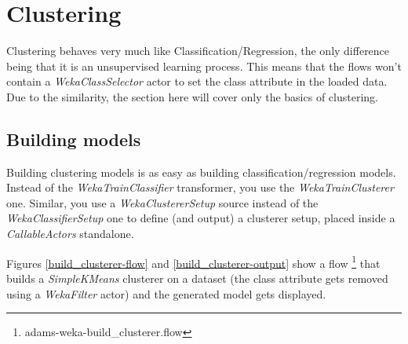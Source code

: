 %

\chapter{Clustering}
\label{clustering}
Clustering behaves very much like Classification/Regression, the only difference
being that it is an unsupervised learning process. This means that the flows
won't contain a \textit{WekaClassSelector} actor to set the class attribute in
the loaded data. Due to the similarity, the section here will cover only
the basics of clustering.

\section{Building models}
Building clustering models is as easy as building classification/regression
models. Instead of the \textit{WekaTrainClassifier} transformer, you use the
\textit{WekaTrainClusterer} one. Similar, you use a \textit{WekaClustererSetup}
source instead of the \textit{WekaClassifierSetup} one to define (and output)
a clusterer setup, placed inside a \textit{CallableActors} standalone.

Figures \ref{build_clusterer-flow} and \ref{build_clusterer-output} show a flow
\footnote{adams-weka-build\_clusterer.flow} that builds a \textit{SimpleKMeans}
clusterer on a dataset (the class attribute gets removed using a
\textit{WekaFilter} actor) and the generated model gets displayed.

